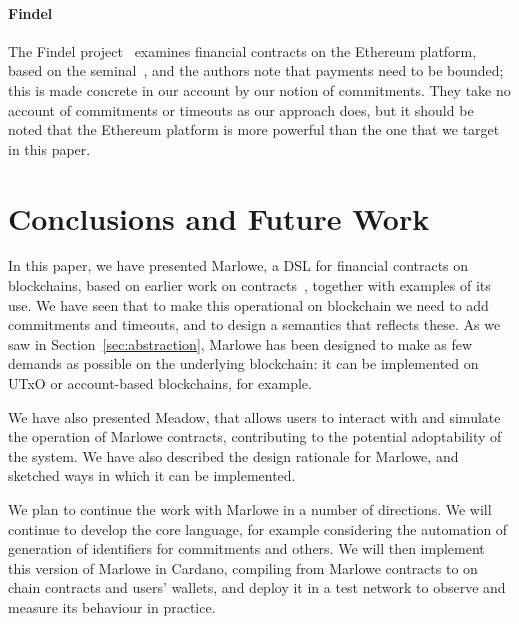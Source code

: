 \documentclass[runningheads]{llncs}
\begin{document}
%

\paragraph{Findel}

The Findel project~\cite{findel} examines financial contracts on the Ethereum platform, based on the 
seminal~\cite{PeytonJones:2000}, and the authors note that payments need to be bounded; this is made concrete in our 
account by our notion of commitments. They take no account of commitments or timeouts as our approach does, but it 
should be noted that the Ethereum platform is more powerful than the one that we target in this paper.


\section{Conclusions and Future Work}
\label{section:next-steps}

In this paper, we have presented Marlowe, a DSL for financial contracts on blockchains, based on earlier work on 
contracts~\cite{PeytonJones:2000}, together with examples of its use. We have seen that to make this operational on 
blockchain we need to add commitments and timeouts, and to design a semantics that reflects these. As we saw in 
Section~\ref{sec:abstraction}, Marlowe has been designed to make as few demands as possible on the underlying 
blockchain: it can be implemented on UTxO or account-based blockchains, for example.

We have also presented Meadow, that allows users to interact with and simulate the operation of Marlowe contracts, 
contributing to the potential adoptability of the system. We have also described the design rationale for Marlowe, and 
sketched ways in which it can be implemented.

We plan to continue the work with Marlowe in a number of directions. We will continue to develop the core language, for 
example considering the automation of generation of identifiers for commitments and others. We will then implement this 
version of Marlowe in Cardano, compiling from Marlowe contracts to on chain contracts and users' wallets, and deploy it 
in a test network to observe and measure its behaviour in practice.
\end{document}
